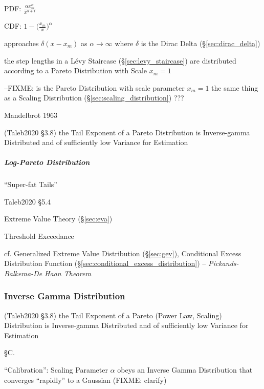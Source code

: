 PDF: $\frac{\alpha x_m^\alpha}{x^{\alpha+1}}$

CDF: $1 - \Big(\frac{x_m}{x}\Big)^\alpha$

approaches $\delta(x - x_m)$ as $\alpha \to \infty$ where $\delta$ is the Dirac
Delta (\S\ref{sec:dirac_delta})

the step lengths in a L\'evy Staircase (\S\ref{sec:levy_staircase}) are
distributed according to a Pareto Distribution with Scale $x_m = 1$

--FIXME: is the Pareto Distribution with scale parameter $x_m = 1$ the same
thing as a Scaling Distribution (\S\ref{sec:scaling_distribution}) ???

Mandelbrot 1963

(Taleb2020 \S 3.8) the Tail Exponent of a Pareto Distribution is Inverse-gamma
Distributed and of sufficiently low Variance for Estimation



\subparagraph{Log-Pareto Distribution}\label{sec:log_pareto}\hfill

``Super-fat Tails''

Taleb2020 \S 5.4



\label{sec:generalized_pareto}

Extreme Value Theory (\S\ref{sec:eva})

Threshold Exceedance

cf. Generalized Extreme Value Distribution (\S\ref{sec:gev}),
Conditional Excess Distribution Function
(\S\ref{sec:conditional_excess_distribution}) --
\emph{Pickands-Balkema-De Haan Theorem}



\subsubsection{Inverse Gamma Distribution}\label{sec:inverse_gamma}


(Taleb2020 \S 3.8) the Tail Exponent of a Pareto (Power Law, Scaling)
Distribution is Inverse-gamma Distributed and of sufficiently low Variance for
Estimation

\S C.

``Calibration'': Scaling Parameter $\alpha$ obeys an Inverse Gamma Distribution
that converges ``rapidly'' to a Gaussian (FIXME: clarify)



